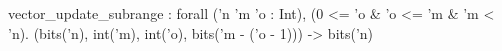 vector_update_subrange : forall ('n 'm 'o : Int), (0 <= 'o & 'o <= 'm & 'm < 'n).
  (bits('n), int('m), int('o), bits('m - ('o - 1))) -> bits('n)